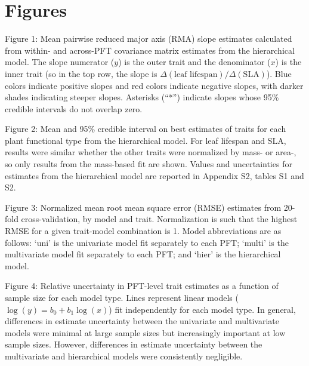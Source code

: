 \documentclass{article}
\begin{document}
\pagebreak

\section*{Figures}

\noindent Figure 1:
Mean pairwise reduced major axis (RMA) slope estimates calculated from within- and across-PFT covariance matrix estimates from the hierarchical model.
The slope numerator ($y$) is the outer trait and the denominator ($x$) is the inner trait (so in the top row, the slope is $\Delta(\textrm{leaf lifespan}) / \Delta(\textrm{SLA})$).
Blue colors indicate positive slopes and red colors indicate negative slopes, with darker shades indicating steeper slopes.
Asterisks (``*'') indicate slopes whose 95\% credible intervals do not overlap zero.

\vspace{\baselineskip}

\noindent Figure 2:
Mean and 95\% credible interval on best estimates of traits for each plant functional type from the hierarchical model.
For leaf lifespan and SLA, results were similar whether the other traits were normalized by mass- or area-, so only results from the mass-based fit are shown.
Values and uncertainties for estimates from the hierarchical model are reported in Appendix S2, tables S1 and S2.

\vspace{\baselineskip}

\noindent Figure 3:
Normalized mean root mean square error (RMSE) estimates from 20-fold cross-validation, by model and trait.
Normalization is such that the highest RMSE for a given trait-model combination is 1.
Model abbreviations are as follows:
`uni' is the univariate model fit separately to each PFT;\@
`multi' is the multivariate model fit separately to each PFT;\@
and `hier' is the hierarchical model.

\vspace{\baselineskip}

\noindent Figure 4:
Relative uncertainty in PFT-level trait estimates as a function of sample size for each model type.
Lines represent linear models ($\log(y) = b_0 + b_1 \log(x)$) fit independently for each model type.
In general, differences in estimate uncertainty between the univariate and multivariate models were minimal at large sample sizes but increasingly important at low sample sizes.
However, differences in estimate uncertainty between the multivariate and hierarchical models were consistently negligible.
\end{document}
